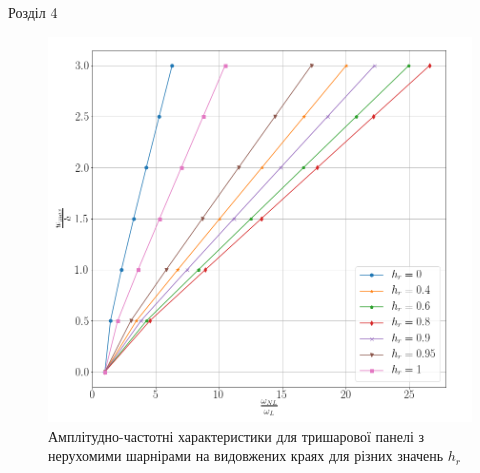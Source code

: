\documentclass[handout, 8pt]{beamer}
\numberwithin{figure}{section}
\numberwithin{equation}{section}
\numberwithin{table}{section}
\begin{document}
\begin{frame}{Розділ 4}

\begin{figure}
	\includegraphics[scale=0.2]{pic/AFR_layered2.png}
		\caption{Амплітудно-частотні характеристики для тришарової панелі з нерухомими шарнірами на видовжених краях для різних значень $h_{r}$}
		\label{fig:AFR_layers}
\end{figure}


\end{frame}
\end{document}

